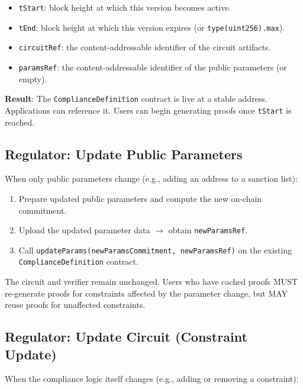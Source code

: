 \documentclass[9pt]{extreport}
\begin{document}
\begin{enumerate}
\begin{itemize}
        \item \texttt{tStart}: block height at which this version becomes active.
        \item \texttt{tEnd}: block height at which this version expires (or \texttt{type(uint256).max}).
        \item \texttt{circuitRef}: the content-addressable identifier of the circuit artifacts.
        \item \texttt{paramsRef}: the content-addressable identifier of the public parameters (or empty).
    \end{itemize}
\end{enumerate}

\textbf{Result}: The \texttt{ComplianceDefinition} contract is live at a stable address. Applications can reference it. Users can begin generating proofs once \texttt{tStart} is reached.

\subsection{Regulator: Update Public Parameters}
\label{sec:regulator-update-params}

When only public parameters change (e.g., adding an address to a sanction list):

\begin{enumerate}
    \item Prepare updated public parameters and compute the new on-chain commitment.
    \item Upload the updated parameter data $\to$ obtain \texttt{newParamsRef}.
    \item Call \texttt{updateParams(newParamsCommitment, newParamsRef)} on the existing\\ \texttt{ComplianceDefinition} contract.
\end{enumerate}

The circuit and verifier remain unchanged. Users who have cached proofs MUST re-generate proofs for constraints affected by the parameter change, but MAY reuse proofs for unaffected constraints.

\subsection{Regulator: Update Circuit (Constraint Update)}
\label{sec:regulator-update-circuit}

When the compliance logic itself changes (e.g., adding or removing a constraint):
\end{document}
